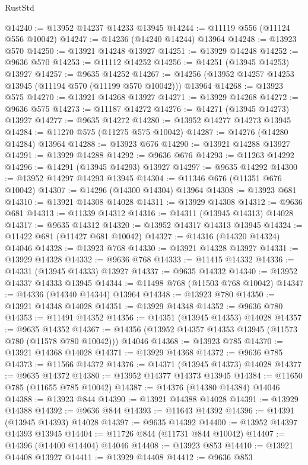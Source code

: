 \begin{lexlean}{RustStd}
\begin{coremodule}
@14240 := @13952 @14237 @14233 @13945
@14244 := @11119 @556 (@11124 @556 @10042)
@14247 := @14236 (@14240 @14244) @13964
@14248 := @13923 @570
@14250 := @13921 @14248 @13927
@14251 := @13929 @14248
@14252 := @9636 @570
@14253 := @11112 @14252
@14256 := @14251 (@13945 @14253) @13927
@14257 := @9635 @14252
@14267 := @14256 (@13952 @14257 @14253 @13945 (@11194 @570 (@11199 @570 @10042))) @13964
@14268 := @13923 @575
@14270 := @13921 @14268 @13927
@14271 := @13929 @14268
@14272 := @9636 @575
@14273 := @11187 @14272
@14276 := @14271 (@13945 @14273) @13927
@14277 := @9635 @14272
@14280 := @13952 @14277 @14273 @13945
@14284 := @11270 @575 (@11275 @575 @10042)
@14287 := @14276 (@14280 @14284) @13964
@14288 := @13923 @676
@14290 := @13921 @14288 @13927
@14291 := @13929 @14288
@14292 := @9636 @676
@14293 := @11263 @14292
@14296 := @14291 (@13945 @14293) @13927
@14297 := @9635 @14292
@14300 := @13952 @14297 @14293 @13945
@14304 := @11346 @676 (@11351 @676 @10042)
@14307 := @14296 (@14300 @14304) @13964
@14308 := @13923 @681
@14310 := @13921 @14308 @14028
@14311 := @13929 @14308
@14312 := @9636 @681
@14313 := @11339 @14312
@14316 := @14311 (@13945 @14313) @14028
@14317 := @9635 @14312
@14320 := @13952 @14317 @14313 @13945
@14324 := @11422 @681 (@11427 @681 @10042)
@14327 := @14316 (@14320 @14324) @14046
@14328 := @13923 @768
@14330 := @13921 @14328 @13927
@14331 := @13929 @14328
@14332 := @9636 @768
@14333 := @11415 @14332
@14336 := @14331 (@13945 @14333) @13927
@14337 := @9635 @14332
@14340 := @13952 @14337 @14333 @13945
@14344 := @11498 @768 (@11503 @768 @10042)
@14347 := @14336 (@14340 @14344) @13964
@14348 := @13923 @780
@14350 := @13921 @14348 @14028
@14351 := @13929 @14348
@14352 := @9636 @780
@14353 := @11491 @14352
@14356 := @14351 (@13945 @14353) @14028
@14357 := @9635 @14352
@14367 := @14356 (@13952 @14357 @14353 @13945 (@11573 @780 (@11578 @780 @10042))) @14046
@14368 := @13923 @785
@14370 := @13921 @14368 @14028
@14371 := @13929 @14368
@14372 := @9636 @785
@14373 := @11566 @14372
@14376 := @14371 (@13945 @14373) @14028
@14377 := @9635 @14372
@14380 := @13952 @14377 @14373 @13945
@14384 := @11650 @785 (@11655 @785 @10042)
@14387 := @14376 (@14380 @14384) @14046
@14388 := @13923 @844
@14390 := @13921 @14388 @14028
@14391 := @13929 @14388
@14392 := @9636 @844
@14393 := @11643 @14392
@14396 := @14391 (@13945 @14393) @14028
@14397 := @9635 @14392
@14400 := @13952 @14397 @14393 @13945
@14404 := @11726 @844 (@11731 @844 @10042)
@14407 := @14396 (@14400 @14404) @14046
@14408 := @13923 @853
@14410 := @13921 @14408 @13927
@14411 := @13929 @14408
@14412 := @9636 @853

\end{coremodule}
\end{lexlean}
